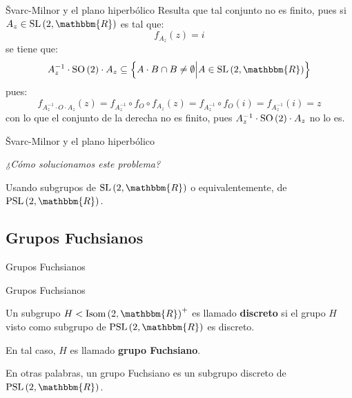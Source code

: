 \documentclass[xcolor=dvipsnames]{beamer}
\theoremstyle{largebreak}
\newcommand{\bbm}[1]{\ensuremath{\mathbbm{#1}}}
\newcommand{\Isom}[1]{\ensuremath{\textup{Isom}\left(#1\right)}}
\newcommand{\SO}[1]{\ensuremath{\textup{SO}\left(#1\right)}}
\newcommand{\SL}[1]{\ensuremath{\textup{SL}\left(#1\right)}}
\newcommand{\PSL}[1]{\ensuremath{\textup{PSL}\left(#1\right)}}
\begin{document}
\begin{frame}{Švarc-Milnor y el plano hiperbólico}
    Resulta que tal conjunto no es finito, pues si $A_z\in\SL{2,\bbm{R}}$ es tal que:
    \begin{equation*}
        f_{A_z}(z)=i
    \end{equation*}
    se tiene que:
    \begin{equation*}
        A_z^{-1}\cdot\SO{2}\cdot A_z\subseteq\left\{A\cdot B\cap B\neq\emptyset \Big|A\in\SL{2,\bbm{R}} \right\}
    \end{equation*}
    pues:
    \begin{equation*}
        f_{A_z^{-1}\cdot O\cdot A_z}(z)=f_{A_z^{-1}}\circ f_{O}\circ f_{A_z}(z)=f_{A_z^{-1}}\circ f_{O}(i)=f_{A_z^{-1}}(i)=z
    \end{equation*}
    con lo que el conjunto de la derecha no es finito, pues $A_z^{-1}\cdot\SO{2}\cdot A_z$ no lo es.
\end{frame}

\begin{frame}{Švarc-Milnor y el plano hiperbólico}
    \begin{center}
        \textit{¿Cómo solucionamos este problema?}

        Usando subgrupos de $\SL{2,\bbm{R}}$ o equivalentemente, de $\PSL{2,\bbm{R}}$.
    \end{center}
\end{frame}


\subsection{Grupos Fuchsianos}

\begin{frame}
    \begin{center}
        Grupos Fuchsianos
    \end{center}
\end{frame}

\begin{frame}{Grupos Fuchsianos}
    \begin{mydef}
        Un subgrupo $H<\Isom{2,\bbm{R}}^+$ es llamado \textbf{discreto} si el grupo $H$ visto como subgrupo de $\PSL{2,\bbm{R}}$ es discreto.
        
        En tal caso, $H$ es llamado \textbf{grupo Fuchsiano}.
    \end{mydef}

    En otras palabras, un grupo Fuchsiano es un subgrupo discreto de $\PSL{2,\bbm{R}}$.
\end{frame}
\end{document}
